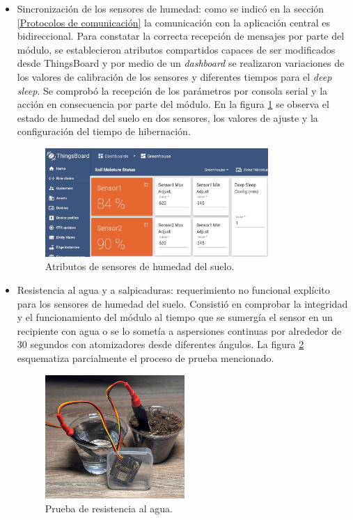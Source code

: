 \begin{itemize}
\item Sincronización de los sensores de humedad: como se indicó en la sección \ref{Protocolos de comunicación} la comunicación con la aplicación central es bidireccional. Para constatar la correcta recepción de mensajes por parte del módulo, se establecieron atributos compartidos capaces de ser modificados desde ThingsBoard y por medio de  un \textit{dashboard} se realizaron variaciones de los valores de calibración de los sensores y diferentes tiempos para el \textit{deep sleep}.
Se comprobó la recepción de los parámetros por consola serial y la acción en consecuencia por parte del módulo.
En la figura \ref{fig:soil_calib} se observa el estado de humedad del suelo en dos sensores, los valores de ajuste y la configuración del tiempo de hibernación.

\begin{figure}[!h]
	\centering
	\includegraphics[width=0.80\textwidth]{./Figures/chapter4/soil_calib.jpg}
	\caption[Atributos de sensores de humedad del suelo]{Atributos de sensores de humedad del suelo.}
	\label{fig:soil_calib}
\end{figure}

\item Resistencia al agua y a salpicaduras: requerimiento no funcional explícito para los sensores de humedad del suelo. Consistió en comprobar la integridad y el funcionamiento del módulo al tiempo que se sumergía el sensor en un recipiente con agua o se lo sometía a aspersiones continuas por alrededor de 30 segundos con atomizadores desde diferentes ángulos.
La figura \ref{fig:soil_test} esquematiza parcialmente el proceso de prueba mencionado.

\begin{figure}[h]
	\centering
	\includegraphics[width=0.50\textwidth]{./Figures/chapter4/soil_testing3.jpg}
	\caption[Prueba de resistencia al agua]{Prueba de resistencia al agua.}
	\label{fig:soil_test}
\end{figure}
  
\end{itemize}
